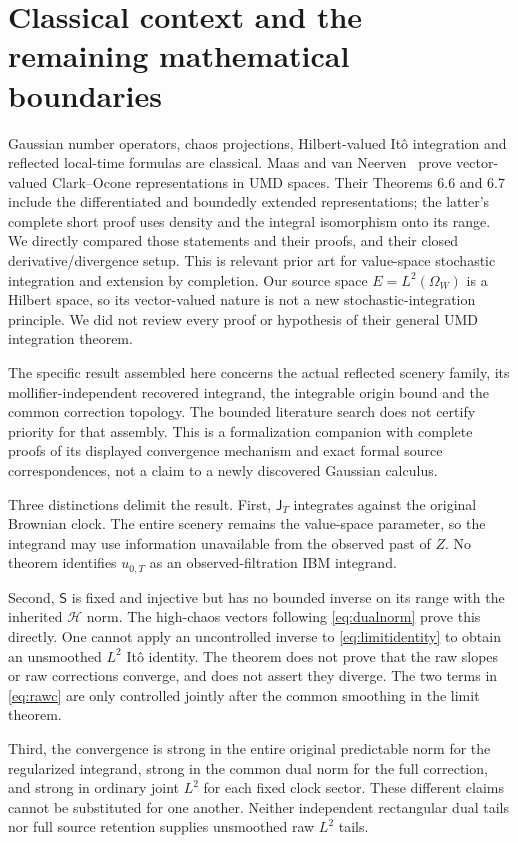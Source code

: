\documentclass[11pt]{article}
\newcommand{\HH}{\mathcal H}
\newcommand{\Smo}{\mathsf S}
\newcommand{\J}{\mathsf J}
\begin{document}
\section{Classical context and the remaining mathematical boundaries}
Gaussian number operators, chaos projections, Hilbert-valued It\^o
integration and reflected local-time formulas are classical.
Maas and van Neerven~\cite{maas} prove vector-valued Clark--Ocone
representations in UMD spaces. Their Theorems 6.6 and 6.7 include
the differentiated and boundedly extended representations;
the latter's complete short proof uses density and the integral
isomorphism onto its range. We directly compared those statements
and their proofs, and their closed derivative/divergence setup.
This is relevant prior art for value-space stochastic integration
and extension by completion. Our source space $E=L^2(\Omega_W)$
is a Hilbert space, so its vector-valued nature is not a new
stochastic-integration principle. We did not review every proof
or hypothesis of their general UMD integration theorem.

The specific result assembled here concerns the actual reflected
scenery family, its mollifier-independent recovered integrand,
the integrable origin bound and the common correction topology.
The bounded literature search does not certify priority for that
assembly. This is a formalization companion with complete proofs
of its displayed convergence mechanism and exact formal source
correspondences, not a claim to a newly discovered Gaussian calculus.

Three distinctions delimit the result. First, $\J_T$ integrates
against the original Brownian clock. The entire scenery remains
the value-space parameter, so the integrand may use information
unavailable from the observed past of $Z$. No theorem identifies
$u_{0,T}$ as an observed-filtration IBM integrand.

Second, $\Smo$ is fixed and injective but has no bounded inverse
on its range with the inherited $\HH$ norm. The high-chaos
vectors following \eqref{eq:dualnorm} prove this directly.
One cannot apply an uncontrolled inverse to
\eqref{eq:limitidentity} to obtain an unsmoothed $L^2$ It\^o
identity. The theorem does not prove that the raw slopes or
raw corrections converge, and does not assert they diverge.
The two terms in \eqref{eq:rawc} are only controlled jointly
after the common smoothing in the limit theorem.

Third, the convergence is strong in the entire original
predictable norm for the regularized integrand, strong in the
common dual norm for the full correction, and strong in ordinary
joint $L^2$ for each fixed clock sector. These different claims
cannot be substituted for one another. Neither independent
rectangular dual tails nor full source retention supplies
unsmoothed raw $L^2$ tails.
\end{document}

